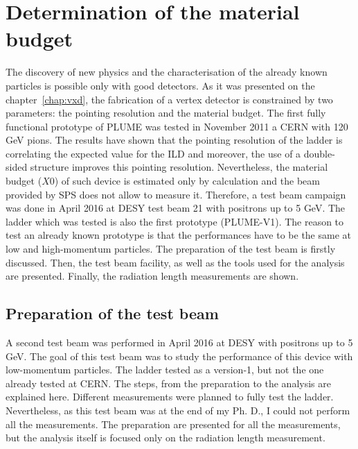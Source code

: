 \chapter{Determination of the material budget}

  The discovery of new physics and the characterisation of the already known particles is possible only with good detectors.
  As it was presented on the chapter~\ref{chap:vxd}, the fabrication of a vertex detector is constrained by two parameters: the pointing resolution and the material budget.
  The first fully functional prototype of \gls{PLUME} was tested in November 2011 a CERN with 120 GeV pions.
  The results have shown that the pointing resolution of the ladder is correlating the expected value for the \gls{ILD} and moreover, the use of a double-sided structure improves this pointing resolution. 
  Nevertheless, the material budget ($X0$) of such device is estimated only by calculation and the beam provided by SPS does not allow to measure it.
  Therefore, a test beam campaign was done in April 2016 at DESY test beam 21 with positrons up to 5 GeV.
  The ladder which was tested is also the first prototype (PLUME-V1). 
  The reason to test an already known prototype is that the performances have to be the same at low and high-momentum particles.
  The preparation of the test beam is firstly discussed.
  Then, the test beam facility, as well as the tools used for the analysis are presented.
  Finally, the radiation length measurements are shown.


\minitoc

  \section{Preparation of the test beam}

   A second test beam was performed in April 2016 at DESY with positrons up to 5 GeV. 
   The goal of this test beam was to study the performance of this device with low-momentum particles.
   The ladder tested as a version-1, but not the one already tested at CERN.
   The steps, from the preparation to the analysis are explained here.
   Different measurements were planned to fully test the ladder.
   Nevertheless, as this test beam was at the end of my Ph. D., I could not perform all the measurements.
   The preparation are presented for all the measurements, but the analysis itself is focused only on the radiation length measurement.

